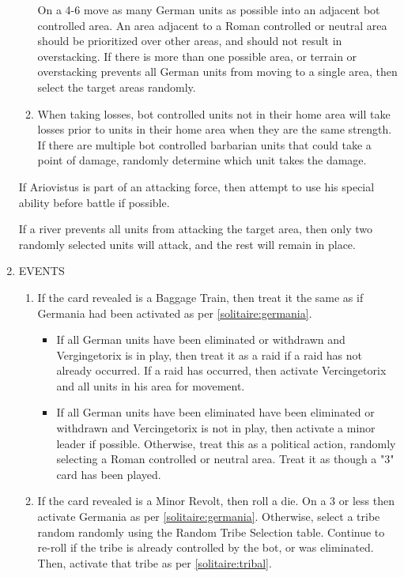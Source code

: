 \begin{enumerate}
\begin{enumerate}[leftmargin=0in]
    On a 4-6 move as many German units as possible into an adjacent bot controlled area. An area adjacent to a Roman controlled or neutral area should be prioritized over other areas, and should not result in overstacking. If there is more than one possible area, or terrain or overstacking prevents all German units from moving to a single area, then select the target areas randomly.

    \item When taking losses, bot controlled units not in their home area will take losses prior to units in their home area when they are the same strength. If there are multiple bot controlled barbarian units that could take a point of damage, randomly determine which unit takes the damage.
  \end{enumerate}

  If Ariovistus is part of an attacking force, then attempt to use his special ability before battle if possible.

  If a river prevents all units from attacking the target area, then only two randomly selected units will attack, and the rest will remain in place.

  \item EVENTS

  \begin{enumerate}[leftmargin=0in]
    \item If the card revealed is a Baggage Train, then treat it the same as if Germania had been activated as per \ref{solitaire:germania}.

    \begin{itemize}
    \item If all German units have been eliminated or withdrawn and Vergingetorix is in play, then treat it as a raid if a raid has not already occurred. If a raid has occurred, then activate Vercingetorix and all units in his area for movement.

    \item If all German units have been eliminated have been eliminated or withdrawn and Vercingetorix is not in play, then activate a minor leader if possible. Otherwise, treat this as a political action, randomly selecting a Roman controlled or neutral area. Treat it as though a "3" card has been played.
    \end{itemize}

    \item If the card revealed is a Minor Revolt, then roll a die. On a 3 or less then activate Germania as per \ref{solitaire:germania}. Otherwise, select a tribe random randomly using the Random Tribe Selection table. Continue to re-roll if the tribe is already controlled by the bot, or was eliminated. Then, activate that tribe as per \ref{solitaire:tribal}.


\end{enumerate}
\end{enumerate}
